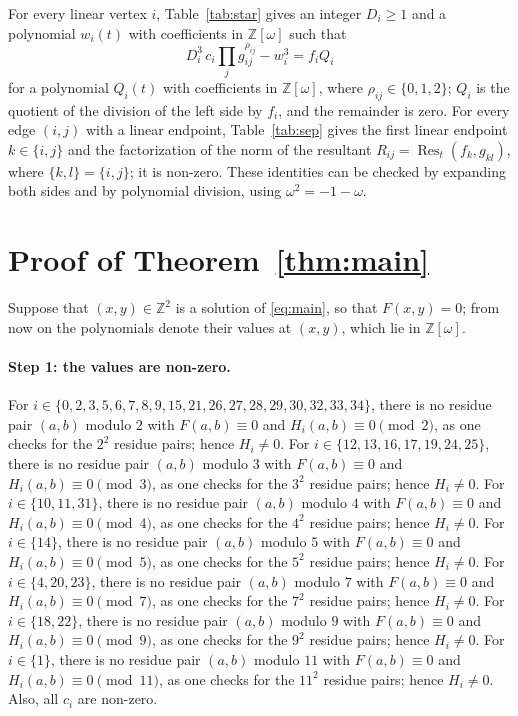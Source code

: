 \documentclass[11pt]{article}
\newcommand{\Z}{\mathbb{Z}}
\begin{document}
For every linear vertex $i$, Table~\ref{tab:star} gives an integer $D_i\geq1$ and a polynomial $w_i(t)$ with coefficients in $\Z[\omega]$ such that
\begin{equation}\label{eq:starlin}
D_i^3\,c_i\prod_jg_{ij}^{\rho_{ij}}-w_i^3=f_iQ_i
\end{equation}
for a polynomial $Q_i(t)$ with coefficients in $\Z[\omega]$, where $\rho_{ij}\in\{0,1,2\}$; $Q_i$ is the quotient of the division of the left side by $f_i$, and the remainder is zero.
For every edge $(i,j)$ with a linear endpoint, Table~\ref{tab:sep} gives the first linear endpoint $k\in\{i,j\}$ and the factorization of the norm of the resultant $R_{ij}=\operatorname{Res}_t(f_k,g_{kl})$, where $\{k,l\}=\{i,j\}$; it is non-zero.
These identities can be checked by expanding both sides and by polynomial division, using $\omega^2=-1-\omega$.

\section{Proof of Theorem~\ref{thm:main}}

Suppose that $(x,y)\in\Z^2$ is a solution of \eqref{eq:main}, so that $F(x,y)=0$; from now on the polynomials denote their values at $(x,y)$, which lie in $\Z[\omega]$.
\paragraph{Step 1: the values are non-zero.} For $i\in\{0,\allowbreak 2,\allowbreak 3,\allowbreak 5,\allowbreak 6,\allowbreak 7,\allowbreak 8,\allowbreak 9,\allowbreak 15,\allowbreak 21,\allowbreak 26,\allowbreak 27,\allowbreak 28,\allowbreak 29,\allowbreak 30,\allowbreak 32,\allowbreak 33,\allowbreak 34\}$, there is no residue pair $(a,b)$ modulo $2$ with $F(a,b)\equiv0$ and $H_i(a,b)\equiv0\pmod{2}$, as one checks for the $2^2$ residue pairs; hence $H_i\neq0$. For $i\in\{12,\allowbreak 13,\allowbreak 16,\allowbreak 17,\allowbreak 19,\allowbreak 24,\allowbreak 25\}$, there is no residue pair $(a,b)$ modulo $3$ with $F(a,b)\equiv0$ and $H_i(a,b)\equiv0\pmod{3}$, as one checks for the $3^2$ residue pairs; hence $H_i\neq0$. For $i\in\{10,\allowbreak 11,\allowbreak 31\}$, there is no residue pair $(a,b)$ modulo $4$ with $F(a,b)\equiv0$ and $H_i(a,b)\equiv0\pmod{4}$, as one checks for the $4^2$ residue pairs; hence $H_i\neq0$. For $i\in\{14\}$, there is no residue pair $(a,b)$ modulo $5$ with $F(a,b)\equiv0$ and $H_i(a,b)\equiv0\pmod{5}$, as one checks for the $5^2$ residue pairs; hence $H_i\neq0$. For $i\in\{4,\allowbreak 20,\allowbreak 23\}$, there is no residue pair $(a,b)$ modulo $7$ with $F(a,b)\equiv0$ and $H_i(a,b)\equiv0\pmod{7}$, as one checks for the $7^2$ residue pairs; hence $H_i\neq0$. For $i\in\{18,\allowbreak 22\}$, there is no residue pair $(a,b)$ modulo $9$ with $F(a,b)\equiv0$ and $H_i(a,b)\equiv0\pmod{9}$, as one checks for the $9^2$ residue pairs; hence $H_i\neq0$. For $i\in\{1\}$, there is no residue pair $(a,b)$ modulo $11$ with $F(a,b)\equiv0$ and $H_i(a,b)\equiv0\pmod{11}$, as one checks for the $11^2$ residue pairs; hence $H_i\neq0$. Also, all $c_i$ are non-zero.
\end{document}
